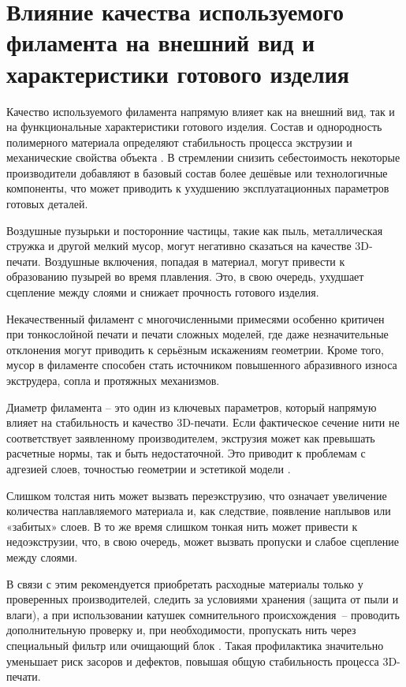 \section{Влияние качества используемого филамента на внешний вид и характеристики готового изделия}

Качество используемого филамента напрямую влияет как на внешний вид, так и на функциональные характеристики готового изделия. Состав и однородность полимерного материала определяют стабильность процесса экструзии и механические свойства объекта \cite{кондрашов2019влияние}. В стремлении снизить себестоимость некоторые производители добавляют в базовый состав более дешёвые или технологичные компоненты, что может приводить к ухудшению эксплуатационных параметров готовых деталей.

Воздушные пузырьки и посторонние частицы, такие как пыль, металлическая стружка и другой мелкий мусор, могут негативно сказаться на качестве 3D-печати. Воздушные включения, попадая в материал, могут привести к образованию пузырей во время плавления. Это, в свою очередь, ухудшает сцепление между слоями и снижает прочность готового изделия\cite{скосарев2022влияние}.

Некачественный филамент с многочисленными примесями особенно критичен при тонкослойной печати и печати сложных моделей, где даже незначительные отклонения могут приводить к серьёзным искажениям геометрии. Кроме того, мусор в филаменте способен стать источником повышенного абразивного износа экструдера, сопла и протяжных механизмов.

Диаметр филамента -- это один из ключевых параметров, который напрямую влияет на стабильность и качество 3D-печати. Если фактическое сечение нити не соответствует заявленному производителем, экструзия может как превышать расчетные нормы, так и быть недостаточной. Это приводит к проблемам с адгезией слоев, точностью геометрии и эстетикой модели \cite{кордикова2024влияние}.

Слишком толстая нить может вызвать переэкструзию, что означает увеличение количества наплавляемого материала и, как следствие, появление наплывов или «забитых» слоев. В то же время слишком тонкая нить может привести к недоэкструзии, что, в свою очередь, может вызвать пропуски и слабое сцепление между слоями. 

В связи с этим рекомендуется приобретать расходные материалы только у проверенных производителей, следить за условиями хранения (защита от пыли и влаги), а при использовании катушек сомнительного происхождения~-- проводить дополнительную проверку и, при необходимости, пропускать нить через специальный фильтр или очищающий блок \cite{петров2017влиянии}. Такая профилактика значительно уменьшает риск засоров и дефектов, повышая общую стабильность процесса 3D-печати.



